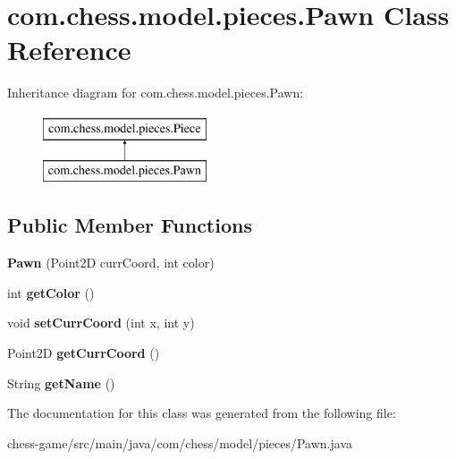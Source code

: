 \hypertarget{classcom_1_1chess_1_1model_1_1pieces_1_1_pawn}{}\section{com.\+chess.\+model.\+pieces.\+Pawn Class Reference}
\label{classcom_1_1chess_1_1model_1_1pieces_1_1_pawn}
Inheritance diagram for com.\+chess.\+model.\+pieces.\+Pawn\+:\begin{figure}[H]
\begin{center}
\leavevmode
\includegraphics[height=2.000000cm]{classcom_1_1chess_1_1model_1_1pieces_1_1_pawn}
\end{center}
\end{figure}
\subsection*{Public Member Functions}
\begin{DoxyCompactItemize}
\item 
\mbox{\label{classcom_1_1chess_1_1model_1_1pieces_1_1_pawn_a1ec9de107a22a17076a19ed77c9786d7}} 
{\bfseries Pawn} (Point2D curr\+Coord, int color)
\item 
\mbox{\label{classcom_1_1chess_1_1model_1_1pieces_1_1_pawn_ac45c7a25b47caf105ee59d43d6b21566}} 
int {\bfseries get\+Color} ()
\item 
\mbox{\label{classcom_1_1chess_1_1model_1_1pieces_1_1_pawn_a0e03e777524a41d2eaeffbddb5818bce}} 
void {\bfseries set\+Curr\+Coord} (int x, int y)
\item 
\mbox{\label{classcom_1_1chess_1_1model_1_1pieces_1_1_pawn_af2b18f6692c59b44b8636edbccf331f4}} 
Point2D {\bfseries get\+Curr\+Coord} ()
\item 
\mbox{\label{classcom_1_1chess_1_1model_1_1pieces_1_1_pawn_ab38637231b5549a8b56f02625a6df4ba}} 
String {\bfseries get\+Name} ()
\end{DoxyCompactItemize}


The documentation for this class was generated from the following file\+:\begin{DoxyCompactItemize}
\item 
chess-\/game/src/main/java/com/chess/model/pieces/Pawn.\+java\end{DoxyCompactItemize}
